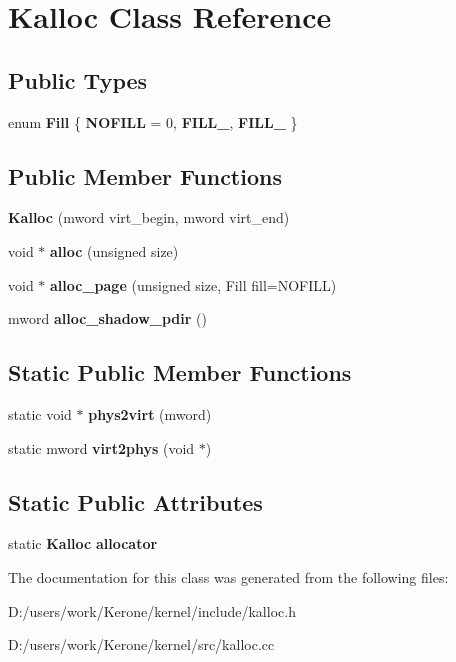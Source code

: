 \section{Kalloc Class Reference}
\label{class_kalloc}
\subsection*{Public Types}
\begin{DoxyCompactItemize}
\item 
\mbox{\label{class_kalloc_a3407fd5f2e0bb951ea01556dd7ccd730}} 
enum {\bfseries Fill} \{ {\bfseries N\+O\+F\+I\+LL} = 0, 
{\bfseries F\+I\+L\+L\+\_}, 
{\bfseries F\+I\+L\+L\+\_}
 \}
\end{DoxyCompactItemize}
\subsection*{Public Member Functions}
\begin{DoxyCompactItemize}
\item 
\mbox{\label{class_kalloc_aec9482a5da7dd1f98ed4aef99dd05738}} 
{\bfseries Kalloc} (mword virt\+\_\+begin, mword virt\+\_\+end)
\item 
\mbox{\label{class_kalloc_ae180df8a72200e00a4e4fc865cfa55bd}} 
void $\ast$ {\bfseries alloc} (unsigned size)
\item 
\mbox{\label{class_kalloc_a25e664b28fdb07ed12fd9430f8de0674}} 
void $\ast$ {\bfseries alloc\+\_\+page} (unsigned size, Fill fill=N\+O\+F\+I\+LL)
\item 
\mbox{\label{class_kalloc_ad0693e08ccf0795f065a40077ef7a3fe}} 
mword {\bfseries alloc\+\_\+shadow\+\_\+pdir} ()
\end{DoxyCompactItemize}
\subsection*{Static Public Member Functions}
\begin{DoxyCompactItemize}
\item 
\mbox{\label{class_kalloc_a5b87551f09b0a89cd1a0a33d1fe3a605}} 
static void $\ast$ {\bfseries phys2virt} (mword)
\item 
\mbox{\label{class_kalloc_a5e83ee9ce1f2ce752cb1844567c013d7}} 
static mword {\bfseries virt2phys} (void $\ast$)
\end{DoxyCompactItemize}
\subsection*{Static Public Attributes}
\begin{DoxyCompactItemize}
\item 
\mbox{\label{class_kalloc_a4ac09a9ffc7e5720c753014fd785e5aa}} 
static \textbf{ Kalloc} {\bfseries allocator}
\end{DoxyCompactItemize}


The documentation for this class was generated from the following files\+:\begin{DoxyCompactItemize}
\item 
D\+:/users/work/\+Kerone/kernel/include/kalloc.\+h\item 
D\+:/users/work/\+Kerone/kernel/src/kalloc.\+cc\end{DoxyCompactItemize}
